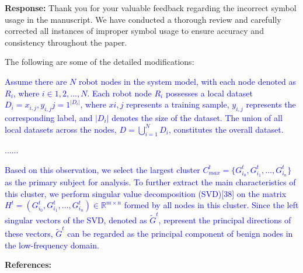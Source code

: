 \documentclass[a4paper,twoside,11pt,dvipsnames]{reviewresponse}
\begin{document}
\textbf{Response:} 
Thank you for your valuable feedback regarding the incorrect symbol usage in the manuscript. We have conducted a thorough review and carefully corrected all instances of improper symbol usage to ensure accuracy and consistency throughout the paper.

The following are some of the detailed modifications: 

\textcolor{blue}{Assume there are $N$ robot nodes in the system model, with each node denoted as $R_i$, where $i \in {1, 2, \ldots, N}$. Each robot node $R_i$ possesses a local dataset $D_i = {x_{i,j}, y_{i,j}}{j=1}^{|D_i|}$, where $x{i,j}$ represents a training sample, $y_{i,j}$ represents the corresponding label, and $|D_i|$ denotes the size of the dataset. The union of all local datasets across the nodes, $D = \bigcup_{i=1}^{N} D_i$, constitutes the overall dataset.}

\textcolor{blue}{......}

\textcolor{blue}{Based on this observation, we select the largest cluster \(C^t_{max} = \{G^t_{i_0}, G^t_{i_1}, \ldots, G^t_{i_n}\}\) as the primary subject for analysis. To further extract the main characteristics of this cluster, we perform singular value decomposition (SVD)[38] on the matrix $H^t = (G^t_{i_0}, G^t_{i_1}, \ldots, G^t_{i_n}) \in \mathbb{R}^{m \times n}$ formed by all nodes in this cluster. Since the left singular vectors of the SVD, denoted as \(\tilde{G}^t\), represent the principal directions of these vectors, \(\tilde{G}^t\) can be regarded as the principal component of benign nodes in the low-frequency domain.}


\newpage

\textbf{\hspace{6.5cm}References:}





\end{document}
